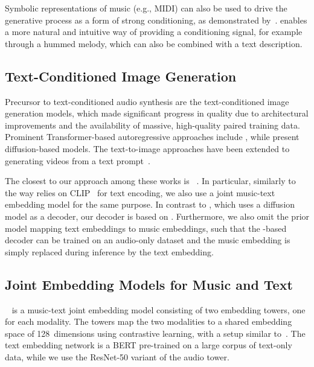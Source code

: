 Symbolic representations of music (e.g., MIDI) can also be used to drive the generative process as a form of strong conditioning, as demonstrated by~\citet{huang2018music, hawthorne2018wave2midi2wave, engel2020ddsp}. {\model} enables a more natural and intuitive way of providing a conditioning signal, for example through a hummed melody, which can also be combined with a text description. 

\subsection{Text-Conditioned Image Generation}

Precursor to text-conditioned audio synthesis are the text-conditioned image generation models, which made significant progress in quality due to architectural improvements and the availability of massive, high-quality paired training data. Prominent Transformer-based autoregressive approaches include \citet{dalle, parti}, while \citet{nichol2021glide, rombach2022high, imagen} present diffusion-based models. The text-to-image approaches have been extended to generating videos from a text prompt~\citep{wu2022nuwa, hong2022cogvideo, phenaki,ho2022video}.

The closest to our approach among these works is {\dalletwo}~\citep{dalle-2}. In particular, similarly to the way {\dalletwo} relies on CLIP~\citep{clip} for text encoding, we also use a joint music-text embedding model for the same purpose. In contrast to  {\dalletwo}, which uses a diffusion model as a decoder, our decoder is based on {\audiolm}. Furthermore, we also omit the prior model mapping text embeddings to music embeddings, such that the {\audiolm}-based decoder can be trained on an audio-only dataset and the music embedding is simply replaced during inference by the text embedding.

\subsection{Joint Embedding Models for Music and Text} \label{subsec:music-text-joint-models}
\mulan~\cite{mulan} is a music-text joint embedding model consisting of two embedding towers, one for each modality. The towers map the two modalities to a shared embedding space of 128~dimensions using contrastive learning, with a setup similar to~\citep{clip,wav2clip}.
The text embedding network is a BERT \cite{bert} pre-trained on a large corpus of text-only data, while we use the ResNet-50 variant of the audio tower.

